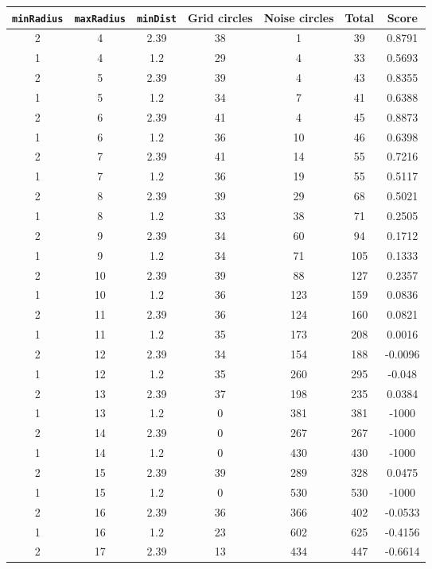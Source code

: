 \documentclass[letterpaper, 12pt]{article}
\begin{document}
\begin{longtable}{|c|c|c|c|c|c|c|}
\hline
\textbf{\texttt{minRadius}} & \textbf{\texttt{maxRadius}} & \textbf{\texttt{minDist}} & \textbf{Grid circles} & \textbf{Noise circles} & \textbf{Total} & \textbf{Score} \\
\hline
2 & 4 & 2.39 & 38 & 1 & 39 & 0.8791 \\
\hline
1 & 4 & 1.2 & 29 & 4 & 33 & 0.5693 \\
\hline
2 & 5 & 2.39 & 39 & 4 & 43 & 0.8355 \\
\hline
1 & 5 & 1.2 & 34 & 7 & 41 & 0.6388 \\
\hline
2 & 6 & 2.39 & 41 & 4 & 45 & 0.8873 \\
\hline
1 & 6 & 1.2 & 36 & 10 & 46 & 0.6398 \\
\hline
2 & 7 & 2.39 & 41 & 14 & 55 & 0.7216 \\
\hline
1 & 7 & 1.2 & 36 & 19 & 55 & 0.5117 \\
\hline
2 & 8 & 2.39 & 39 & 29 & 68 & 0.5021 \\
\hline
1 & 8 & 1.2 & 33 & 38 & 71 & 0.2505 \\
\hline
2 & 9 & 2.39 & 34 & 60 & 94 & 0.1712 \\
\hline
1 & 9 & 1.2 & 34 & 71 & 105 & 0.1333 \\
\hline
2 & 10 & 2.39 & 39 & 88 & 127 & 0.2357 \\
\hline
1 & 10 & 1.2 & 36 & 123 & 159 & 0.0836 \\
\hline
2 & 11 & 2.39 & 36 & 124 & 160 & 0.0821 \\
\hline
1 & 11 & 1.2 & 35 & 173 & 208 & 0.0016 \\
\hline
2 & 12 & 2.39 & 34 & 154 & 188 & -0.0096 \\
\hline
1 & 12 & 1.2 & 35 & 260 & 295 & -0.048 \\
\hline
2 & 13 & 2.39 & 37 & 198 & 235 & 0.0384 \\
\hline
1 & 13 & 1.2 & 0 & 381 & 381 & -1000 \\
\hline
2 & 14 & 2.39 & 0 & 267 & 267 & -1000 \\
\hline
1 & 14 & 1.2 & 0 & 430 & 430 & -1000 \\
\hline
2 & 15 & 2.39 & 39 & 289 & 328 & 0.0475 \\
\hline
1 & 15 & 1.2 & 0 & 530 & 530 & -1000 \\
\hline
2 & 16 & 2.39 & 36 & 366 & 402 & -0.0533 \\
\hline
1 & 16 & 1.2 & 23 & 602 & 625 & -0.4156 \\
\hline
2 & 17 & 2.39 & 13 & 434 & 447 & -0.6614 \\

\end{longtable}
\end{document}
